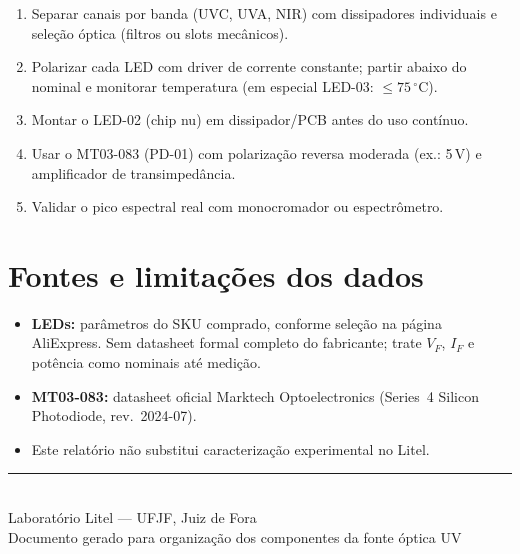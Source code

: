 \documentclass[11pt,a4paper]{article}
\begin{document}
\begin{enumerate}[leftmargin=*]
  \item Separar canais por banda (UVC, UVA, NIR) com dissipadores individuais
        e seleção óptica (filtros ou slots mecânicos).
  \item Polarizar cada LED com driver de corrente constante; partir abaixo
        do nominal e monitorar temperatura (em especial LED-03:
        $\leq 75\,^\circ\mathrm{C}$).
  \item Montar o LED-02 (chip nu) em dissipador/PCB antes do uso contínuo.
  \item Usar o MT03-083 (PD-01) com polarização reversa moderada (ex.: 5\,V)
        e amplificador de transimpedância.
  \item Validar o pico espectral real com monocromador ou espectrômetro.
\end{enumerate}

\section{Fontes e limitações dos dados}

\begin{itemize}[leftmargin=*]
  \item \textbf{LEDs:} parâmetros do SKU comprado, conforme seleção na página
        AliExpress. Sem datasheet formal completo do fabricante; trate
        $V_F$, $I_F$ e potência como nominais até medição.
  \item \textbf{MT03-083:} datasheet oficial Marktech Optoelectronics
        (Series~4 Silicon Photodiode, rev.\ 2024-07).
  \item Este relatório não substitui caracterização experimental no Litel.
\end{itemize}

\vspace{1.5em}
\begin{center}
\rule{0.4\textwidth}{0.4pt}\\[0.6em]
{\small Laboratório Litel --- UFJF, Juiz de Fora}\\
{\small Documento gerado para organização dos componentes da fonte óptica UV}
\end{center}
\end{document}
